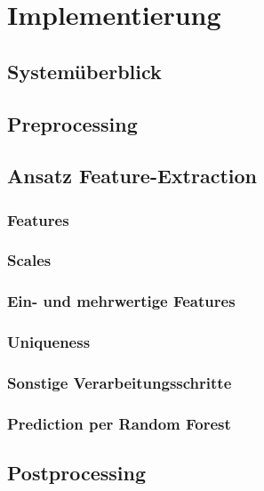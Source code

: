
\chapter{Implementierung}

\section{Systemüberblick} %

\section{Preprocessing} %

\section{Ansatz Feature-Extraction} 

\subsection{Features} %

\subsection{Scales} %

\subsection{Ein- und mehrwertige Features} %

\subsection{Uniqueness} %

\subsection{Sonstige Verarbeitungsschritte} %

\subsection{Prediction per Random Forest} %


\section{Postprocessing} %